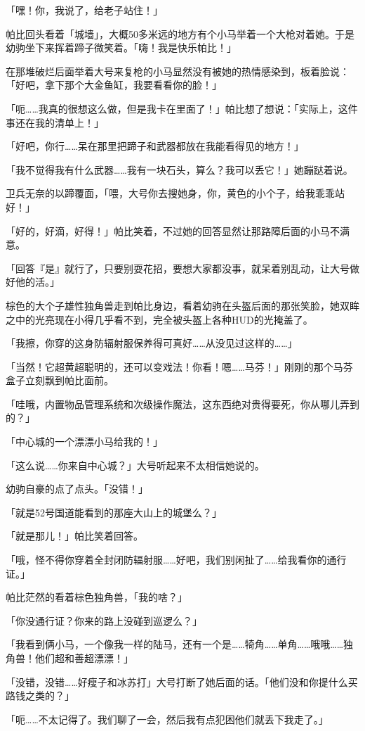 「嘿！你，我说了，给老子站住！」

帕比回头看着「城墙」，大概50多米远的地方有个小马举着一个大枪对着她。于是幼驹坐下来挥着蹄子微笑着。「嗨！我是快乐帕比！」

在那堆破烂后面举着大号来复枪的小马显然没有被她的热情感染到，板着脸说：「好吧，拿下那个大金鱼缸，我要看看你的脸！」

「呃……我真的很想这么做，但是我卡在里面了！」帕比想了想说：「实际上，这件事还在我的清单上！」

「好吧，你行……呆在那里把蹄子和武器都放在我能看得见的地方！」

「我不觉得我有什么武器……我有一块石头，算么？我可以丢它！」她蹦跶着说。

卫兵无奈的以蹄覆面，「喂，大号你去搜她身，你，黄色的小个子，给我乖乖站好！」

「好的，好滴，好得！」帕比笑着，不过她的回答显然让那路障后面的小马不满意。

「回答『是』就行了，只要别耍花招，要想大家都没事，就呆着别乱动，让大号做好他的活。」

棕色的大个子雄性独角兽走到帕比身边，看着幼驹在头盔后面的那张笑脸，她双眸之中的光亮现在小得几乎看不到，完全被头盔上各种HUD的光掩盖了。

「我擦，你穿的这身防辐射服保养得可真好……从没见过这样的……」

「当然！它超黄超聪明的，还可以变戏法！你看！嗯……马芬！」刚刚的那个马芬盒子立刻飘到帕比面前。

「哇哦，内置物品管理系统和次级操作魔法，这东西绝对贵得要死，你从哪儿弄到的？」

「中心城的一个漂漂小马给我的！」

「这么说……你来自中心城？」大号听起来不太相信她说的。

幼驹自豪的点了点头。「没错！」

「就是52号国道能看到的那座大山上的城堡么？」

「就是那儿！」帕比笑着回答。

「哦，怪不得你穿着全封闭防辐射服……好吧，我们别闲扯了……给我看你的通行证。」

帕比茫然的看着棕色独角兽，「我的啥？」

「你没通行证？你来的路上没碰到巡逻么？」

「我看到俩小马，一个像我一样的陆马，还有一个是……犄角……单角……哦哦……独角兽！他们超和善超漂漂！」

「没错，没错……好瘦子和冰苏打」大号打断了她后面的话。「他们没和你提什么买路钱之类的？」

「呃……不太记得了。我们聊了一会，然后我有点犯困他们就丢下我走了。」

